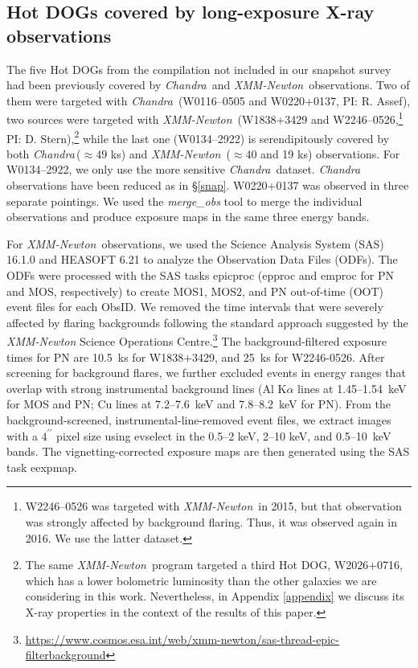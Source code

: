 \documentclass[useAMS,usenatbib]{mnras}
\newcommand*{\xmm}{\textit{\mbox{XMM-Newton}}}
\newcommand*{\chandra}{\textit{Chandra}}
\begin{document}
\subsection{Hot DOGs covered by long-exposure \mbox{X-ray} observations}\label{sample_indiv}
The five Hot DOGs from the \cite{Tsai15} compilation not included in our snapshot survey had been previously covered by \chandra\, and \xmm\, observations. Two of them were targeted with \chandra\, (W0116--0505 and W0220+0137, PI: R. Assef), two sources were targeted with \xmm\, (W1838+3429 and W2246--0526,\footnote{W2246--0526 was targeted with \xmm\, in 2015, but that observation was strongly affected by background flaring. Thus, it was observed again in 2016. We use the latter dataset.} PI: D. Stern),\footnote{The same \xmm\, program targeted a third Hot DOG, W2026+0716, which has a lower bolometric luminosity than the other galaxies we are considering in this work. Nevertheless, in Appendix \ref{appendix} we discuss its X-ray properties in the context of the results of this paper.} while the last one (W0134--2922) is serendipitously covered by both \chandra\,($\approx49$ ks) and \xmm\, ($\approx40$ and 19 ks) observations. For W0134--2922, we only use the more sensitive \chandra\, dataset. \chandra\, observations have been reduced as in \S\ref{snap}. 
W0220+0137 was observed in three separate pointings. We used the \textit{merge\_obs} tool to merge the individual observations and produce exposure maps in the same three energy bands. 

 For \xmm\, observations, we used the Science Analysis System (SAS) 16.1.0 and HEASOFT 6.21
to analyze the Observation Data Files (ODFs). 
The ODFs were processed with the SAS tasks {\sc epicproc} ({\sc epproc} and {\sc emproc} for 
PN and MOS, respectively) to create MOS1, MOS2, and PN out-of-time (OOT) event files for each ObsID. 
We removed the time intervals that were severely affected by flaring backgrounds following the standard approach suggested by the  {\it XMM-Newton} Science Operations Centre.\footnote{\url{https://www.cosmos.esa.int/web/xmm-newton/sas-thread-epic-filterbackground}}
The background-filtered exposure times for PN are 10.5~ks for W1838+3429, and 25~ks for W2246-0526.
After screening for background flares, we further excluded events in energy ranges that overlap with strong instrumental background lines (Al K$\alpha$ lines at 1.45--1.54~keV for MOS and PN; Cu lines at 7.2--7.6~keV and 7.8--8.2~keV for PN).
From the background-screened, instrumental-line-removed event files, we extract images with a $4^{\prime\prime}$ pixel size using {\sc evselect} in the  0.5--2 keV, 2--10 keV, and 0.5--10~keV bands.
The vignetting-corrected exposure maps are then generated using the SAS task {\sc eexpmap}. 
\end{document}

